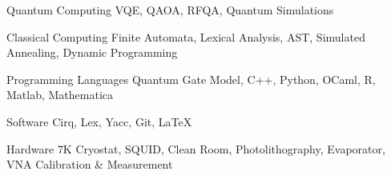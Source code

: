 

\begin{cvskills}

  \cvskill
    {Quantum Computing}
    {VQE, QAOA, RFQA, Quantum Simulations}

  \cvskill
    {Classical Computing}
    {Finite Automata, Lexical Analysis, AST, Simulated Annealing, Dynamic Programming}

  \cvskill
    {Programming Languages}
    {Quantum Gate Model, C++, Python, OCaml, R, Matlab, Mathematica}

  \cvskill
    {Software}
    {Cirq, Lex, Yacc, Git, LaTeX}

  \cvskill
    {Hardware}
    {7K Cryostat, SQUID, Clean Room, Photolithography, Evaporator, VNA Calibration \& Measurement}

\end{cvskills}
